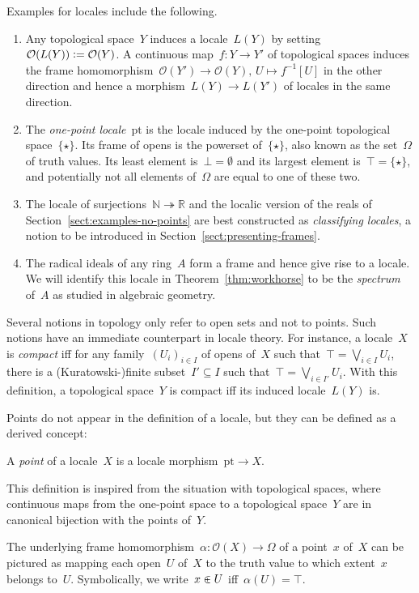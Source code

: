 \documentclass{ws-rv9x6}
\renewcommand{\O}{\mathcal{O}}
\newcommand{\NN}{\mathbb{N}}
\newcommand{\RR}{\mathbb{R}}
\newcommand{\defeq}{\vcentcolon=}
\renewcommand{\_}{\mathpunct{.}}
\newcommand{\?}{\,{:}\,}
\newcommand{\pt}{\mathrm{pt}}
\begin{document}
Examples for locales include the following.
\begin{enumerate}
\item Any topological space~$Y$ induces a locale~$L(Y)$ by
setting~$\O(L(Y)) \defeq \O(Y)$. A continuous map~$f : Y \to Y'$ of topological
spaces induces the frame homomorphism~$\O(Y') \to \O(Y),\,U \mapsto f^{-1}[U]$
in the other direction and hence a morphism~$L(Y) \to L(Y')$ of locales in the
same direction.
\item The \emph{one-point locale}~$\pt$ is the locale induced
by the one-point topological space~$\{\star\}$. Its frame of opens is
the powerset of~$\{\star\}$, also known as the set~$\Omega$ of truth
values. Its least element is~$\bot = \emptyset$ and its largest element
is~$\top = \{\star\}$, and potentially not all elements of~$\Omega$ are equal
to one of these two.
\item The locale of surjections~$\NN \twoheadrightarrow \RR$ and the localic
version of the reals of Section~\ref{sect:examples-no-points} are best
constructed as \emph{classifying locales}, a notion to be introduced in
Section~\ref{sect:presenting-frames}.
\item The radical ideals of any ring~$A$ form a frame and hence give rise to a
locale. We will identify this locale in Theorem~\ref{thm:workhorse} to be the
\emph{spectrum} of~$A$ as studied in algebraic geometry.
\end{enumerate}

Several notions in topology only refer to open sets and not to points. Such
notions have an immediate counterpart in locale theory. For instance, a
locale~$X$ is \emph{compact} iff for any family~$(U_i)_{i \in I}$ of opens
of~$X$ such that~$\top = \bigvee_{i \in I} U_i$, there is a (Kuratowski-)finite
subset~$I' \subseteq I$ such that~$\top = \bigvee_{i \in I'} U_i$.
With this definition, a topological space~$Y$ is compact iff its induced locale~$L(Y)$ is.

Points do not appear in the definition of a locale, but they can be defined as
a derived concept:
\begin{definition}A \emph{point} of a locale~$X$ is a locale morphism~$\pt \to
X$.\end{definition}

This definition is inspired from the situation with topological spaces, where
continuous maps from the one-point space to a topological space~$Y$ are in
canonical bijection with the points of~$Y$.

The underlying frame homomorphism~$\alpha : \O(X) \to \Omega$ of a point~$x$
of~$X$ can be pictured as mapping each open~$U$ of~$X$ to the truth value to which
extent~$x$ belongs to~$U$. Symbolically, we write~$x \inplus U$ iff~$\alpha(U)
= \top$.
\end{document}
